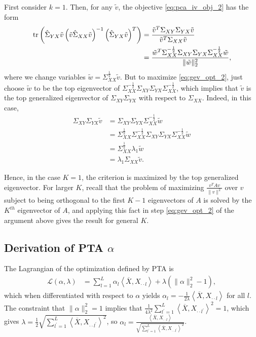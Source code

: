 \documentclass{article}
\begin{document}
First consider $k = 1$. Then, for any $\tilde{v}$, the objective
\ref{eq:pca_iv_obj_2} has the form
\begin{align}
  \mathop\mathrm{tr}\left(\hat{\Sigma}_{YX}\tilde{v}\left(\tilde{v}\hat{\Sigma}_{XX}\tilde{v}\right)^{-1}
  \left(\hat{\Sigma}_{YX}\tilde{v}\right)^{T}\right) &=
  \frac{\tilde{v}^{T}\Sigma_{XY}\Sigma_{YX}\tilde{v}}{\tilde{v}^{T}\Sigma_{XX}\tilde{v}} \label{eq:gev_opt_1}\\
  &= \frac{\tilde{w}^{T}\Sigma_{XX}^{-\frac{1}{2}}\Sigma_{XY}\Sigma_{YX}\Sigma_{XX}^{-\frac{1}{2}}\tilde{w}}{\|\tilde{w}\|_{2}^{2}}, \label{eq:gev_opt_2}
\end{align}
where we change variables $\tilde{w} = \Sigma_{XX}^{\frac{1}{2}}\tilde{v}$. But
to maximize \ref{eq:gev_opt_2}, just choose $\tilde{w}$ to be the top
eigenvector of
$\Sigma_{XX}^{-\frac{1}{2}}\Sigma_{XY}\Sigma_{YX}\Sigma_{XX}^{-\frac{1}{2}}$,
which implies that $\tilde{v}$ is the top generalized eigenvector of
$\Sigma_{XY}\Sigma_{YX}$ with respect to $\Sigma_{XX}$. Indeed, in this case,
\begin{align*}
  \Sigma_{XY}\Sigma_{YX}\tilde{v}
  &=\Sigma_{XY}\Sigma_{YX}\Sigma_{XX}^{-\frac{1}{2}}\tilde{w} \\
  &= \Sigma_{XX}^{\frac{1}{2}} \Sigma_{XX}^{-\frac{1}{2}}\Sigma_{XY}\Sigma_{YX} \Sigma_{XX}^{-\frac{1}{2}}\tilde{w}\\
  &= \Sigma_{XX}^{\frac{1}{2}}\lambda_{1}\tilde{w} \\
  &= \lambda_{1}\Sigma_{XX}\tilde{v}.
\end{align*}

Hence, in the case $K = 1$, the criterion is maximized by the top generalized
eigenvector. For larger $K$, recall that the problem of maximizing
$\frac{v^{T}Av}{\|v\|^{2}}$ over $v$ subject to being orthogonal to the first $K
- 1$ eigenvectors of $A$ is solved by the $K^{th}$ eigenvector of $A$, and
applying this fact in step \ref{eq:gev_opt_2} of the argument above gives the
result for general $K$.

\subsection{Derivation of PTA $\alpha$}
\label{subsec:pta_alpha_derivation}

 The Lagrangian of the optimization defined by PTA is
\begin{align*}
\mathcal{L}\left(\alpha, \lambda\right) &= \sum_{l = 1}^{L}
\alpha_{l}\left<\overline{X}, X_{\cdot\cdot l}\right> +
\lambda\left(\|\alpha\|^{2}_{2} - 1\right),
\end{align*}
which when differentiated with respect to $\alpha$ yields $\alpha_{l} =
-\frac{1}{2\lambda} \left<\overline{X}, X_{\cdot\cdot l}\right>$ for all $l$.
The constraint that $\|\alpha\|_{2}^{2} = 1$ implies that
$\frac{1}{4\lambda^{2}} \sum_{l^{\prime} = 1}^{L} \left<\overline{X},
X_{\cdot\cdot l^{\prime}}\right>^{2} = 1$, which gives $\lambda = \frac{1}{2}
\sqrt{\sum_{l^{\prime} =1 }^{L} \left<\overline{X}, X_{\cdot\cdot
    l^{\prime}}\right>^{2}}$, so $\alpha_{l} = \frac{\left<\overline{X},
  X_{\cdot\cdot l}\right>}{\sqrt{\sum_{l^{\prime} =1}^{L}\left<\overline{X},
    X_{\cdot\cdot l^{\prime}}\right>^{2}}}$.
\end{document}
